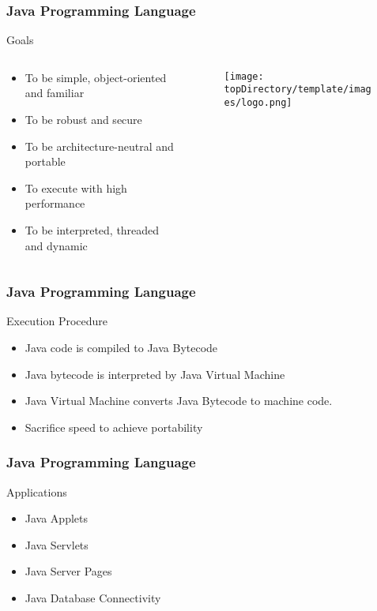 \documentclass[10pt, compress]{beamer}
\begin{document}
\begin{frame}[fragile]
	\frametitle{Java Programming Language}
	\begin{block}{Goals}
		\begin{columns}
			\begin{column}{0.7\textwidth}
			\begin{itemize}
				\item[] To be simple, object-oriented and familiar
				\item[] To be robust and secure
				\item[] To be architecture-neutral and portable
				\item[] To execute with high performance
				\item[] To be interpreted, threaded and dynamic
			\end{itemize}
			\end{column}
			\begin{column}{0.3\textwidth}
			\begin{figure}
				\texttt{[image: \\topDirectory/template/images/logo.png]}
			\end{figure}
			\end{column}
		\end{columns}
	\end{block}
\end{frame}

\begin{frame}[fragile]
	\frametitle{Java Programming Language}
	\begin{block}{Execution Procedure}
		\begin{itemize}
			\item[] Java code is compiled to Java Bytecode
			\item[] Java bytecode is interpreted by Java Virtual Machine
			\item[] Java Virtual Machine converts Java Bytecode to machine code.
			\item[] Sacrifice speed to achieve portability
		\end{itemize}
	\end{block}
\end{frame}

\begin{frame}[fragile]
	\frametitle{Java Programming Language}
	\begin{block}{Applications}
		\begin{itemize}
			\item[] Java Applets
			\item[] Java Servlets
			\item[] Java Server Pages
			\item[] Java Database Connectivity
		\end{itemize}
	\end{block}
\end{frame}
\end{document}
